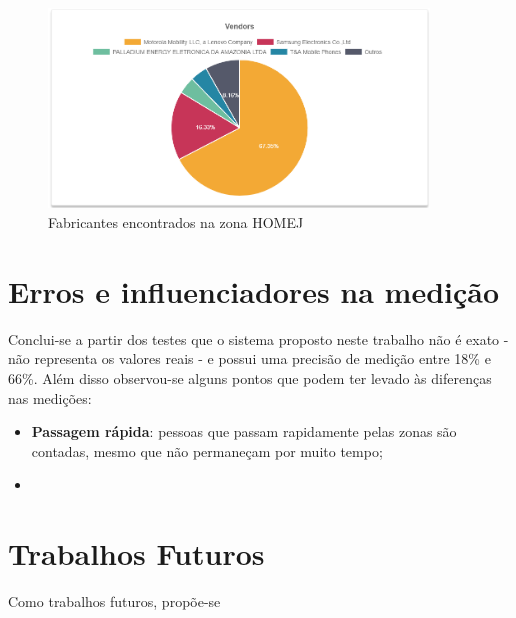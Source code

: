\begin{figure}[!h]
  \caption{\label{graf2}Fabricantes encontrados na zona HOMEJ}
  \begin{center}
    \includegraphics[width=0.90\textwidth]{img/setor.png}
  \end{center}
\end{figure}

\section{Erros e influenciadores na medição}
\label{erros-influencia}
Conclui-se a partir dos testes que o sistema proposto neste trabalho não é exato - não
representa os valores reais - e possui uma precisão de medição entre 18\% e
66\%. Além disso observou-se alguns pontos que podem ter levado às diferenças nas medições:
\begin{itemize}
    \item \textbf{Passagem rápida}: pessoas que passam rapidamente pelas zonas são contadas, mesmo que não
    permaneçam por muito tempo;
    \item

\end{itemize}

\section{Trabalhos Futuros}
Como trabalhos futuros, propõe-se
